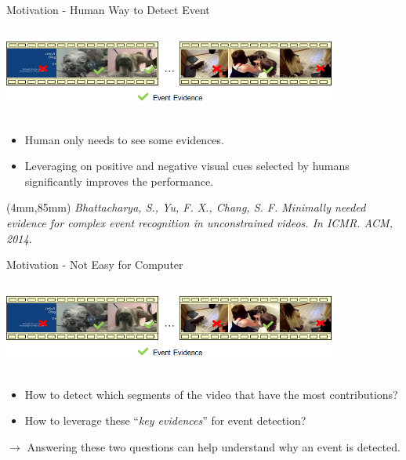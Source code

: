 \documentclass{beamer}
\newenvironment{reference}[2]{%
  \begin{textblock*}{\textwidth}(#1,#2) 
      \footnotesize\it\bgroup\color{red!50!black}}{\egroup\end{textblock*}}
\begin{document}
\begin{frame}{Motivation - Human Way to Detect Event} 
	\begin{center}
		\includegraphics[width=11cm,height=3cm]{images/part4/minimalevidence.png}
	\end{center}
	\begin{itemize}
		\item Human only needs to see some evidences.
		\item Leveraging on positive and negative visual cues selected by humans significantly improves the performance.
	\end{itemize}
 \begin{reference}{4mm}{85mm}
 	Bhattacharya, S., Yu, F. X., Chang, S. F. Minimally needed evidence for complex event recognition in unconstrained videos. In ICMR. ACM, 2014.
 \end{reference}  
\end{frame}

\begin{frame}{Motivation - Not Easy for Computer} 
	\begin{center}
		\includegraphics[width=11cm,height=3cm]{images/part4/minimalevidence.png}
	\end{center}
	
	\begin{itemize}
		\item How to detect which segments of the video that have the most contributions? 	
		\item How to leverage these ``\textit{key evidences}'' for event detection?
	\end{itemize}	
	$\rightarrow$ Answering these two questions can help understand why an event is detected.	
\end{frame}
\end{document}
